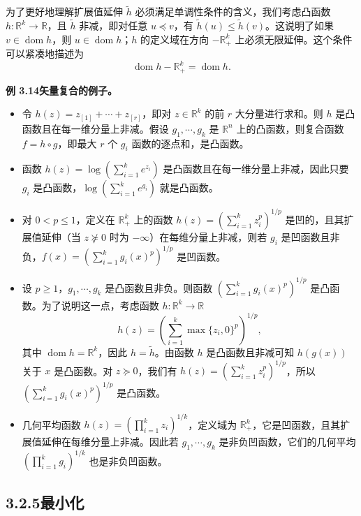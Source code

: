 \documentclass[UTF8,12pt,a4paper,fontset=fandol]{ctexart}
\DeclareMathOperator{\dom}{dom}
\begin{document}
为了更好地理解扩展值延伸 $\tilde h$ 必须满足单调性条件的含义，我们考虑凸函数 $h:\mathbb{R}^k\to\mathbb{R}$，且 $\tilde h$ 非减，即对任意 $u\preceq v$，有 $\tilde h(u)\leq \tilde h(v)$。这说明了如果 $v\in\dom h$，则 $u\in\dom h$；$h$ 的定义域在方向 $-\mathbb{R}_+^k$ 上必须无限延伸。这个条件可以紧凑地描述为
\[
\dom h-\mathbb{R}_+^k=\dom h.
\]

\noindent\textbf{例 3.14\quad 矢量复合的例子。}
\begin{itemize}
\item 令 $h(z)=z_{[1]}+\cdots+z_{[r]}$，即对 $z\in\mathbb{R}^k$ 的前 $r$ 大分量进行求和。则 $h$ 是凸函数且在每一维分量上非减。假设 $g_1,\cdots,g_k$ 是 $\mathbb{R}^n$ 上的凸函数，则复合函数 $f=h\circ g$，即最大 $r$ 个 $g_i$ 函数的逐点和，是凸函数。
\item 函数 $h(z)=\log\left(\sum_{i=1}^k e^{z_i}\right)$ 是凸函数且在每一维分量上非减，因此只要 $g_i$ 是凸函数，$\log\left(\sum_{i=1}^k e^{g_i}\right)$ 就是凸函数。
\item 对 $0<p\leq1$，定义在 $\mathbb{R}_+^k$ 上的函数 $h(z)=\left(\sum_{i=1}^k z_i^p\right)^{1/p}$ 是凹的，且其扩展值延伸（当 $z\nsucceq0$ 时为 $-\infty$）在每维分量上非减，则若 $g_i$ 是凹函数且非负，$f(x)=\left(\sum_{i=1}^k g_i(x)^p\right)^{1/p}$ 是凹函数。
\item 设 $p\geq1$，$g_1,\cdots,g_k$ 是凸函数且非负。则函数 $\left(\sum_{i=1}^k g_i(x)^p\right)^{1/p}$ 是凸函数。为了说明这一点，考虑函数 $h:\mathbb{R}^k\to\mathbb{R}$
\[
h(z)=\left(\sum_{i=1}^k \max\{z_i,0\}^p\right)^{1/p},
\]
其中 $\dom h=\mathbb{R}^k$，因此 $h=\tilde h$。由函数 $h$ 是凸函数且非减可知 $h(g(x))$ 关于 $x$ 是凸函数。对 $z\succeq0$，我们有 $h(z)=\left(\sum_{i=1}^k z_i^p\right)^{1/p}$，所以 $\left(\sum_{i=1}^k g_i(x)^p\right)^{1/p}$ 是凸函数。
\item 几何平均函数 $h(z)=\left(\prod_{i=1}^k z_i\right)^{1/k}$，定义域为 $\mathbb{R}_+^k$，它是凹函数，且其扩展值延伸在每维分量上非减。因此若 $g_1,\cdots,g_k$ 是非负凹函数，它们的几何平均 $\left(\prod_{i=1}^k g_i\right)^{1/k}$ 也是非负凹函数。
\end{itemize}

\subsection*{3.2.5\quad 最小化}
\end{document}
